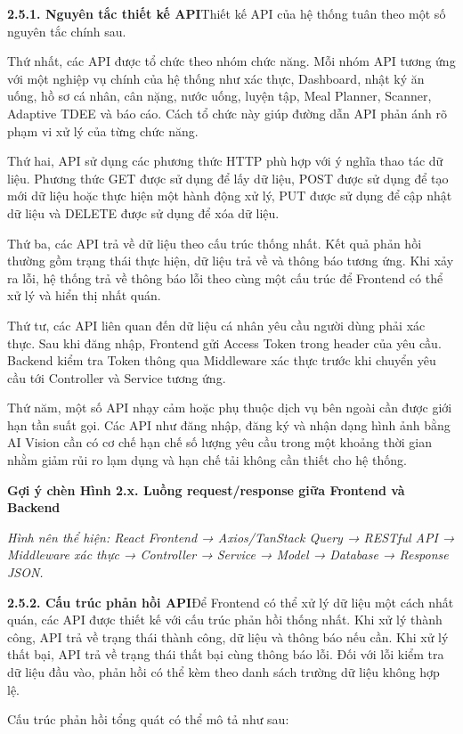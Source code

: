 \textbf{2.5.1. Nguyên tắc thiết kế API}Thiết kế API của hệ thống tuân theo một số nguyên tắc chính sau.

Thứ nhất, các API được tổ chức theo nhóm chức năng. Mỗi nhóm API tương ứng với một nghiệp vụ chính của hệ thống như xác thực, Dashboard, nhật ký ăn uống, hồ sơ cá nhân, cân nặng, nước uống, luyện tập, Meal Planner, Scanner, Adaptive TDEE và báo cáo. Cách tổ chức này giúp đường dẫn API phản ánh rõ phạm vi xử lý của từng chức năng.

Thứ hai, API sử dụng các phương thức HTTP phù hợp với ý nghĩa thao tác dữ liệu. Phương thức GET được sử dụng để lấy dữ liệu, POST được sử dụng để tạo mới dữ liệu hoặc thực hiện một hành động xử lý, PUT được sử dụng để cập nhật dữ liệu và DELETE được sử dụng để xóa dữ liệu.

Thứ ba, các API trả về dữ liệu theo cấu trúc thống nhất. Kết quả phản hồi thường gồm trạng thái thực hiện, dữ liệu trả về và thông báo tương ứng. Khi xảy ra lỗi, hệ thống trả về thông báo lỗi theo cùng một cấu trúc để Frontend có thể xử lý và hiển thị nhất quán.

Thứ tư, các API liên quan đến dữ liệu cá nhân yêu cầu người dùng phải xác thực. Sau khi đăng nhập, Frontend gửi Access Token trong header của yêu cầu. Backend kiểm tra Token thông qua Middleware xác thực trước khi chuyển yêu cầu tới Controller và Service tương ứng.

Thứ năm, một số API nhạy cảm hoặc phụ thuộc dịch vụ bên ngoài cần được giới hạn tần suất gọi. Các API như đăng nhập, đăng ký và nhận dạng hình ảnh bằng AI Vision cần có cơ chế hạn chế số lượng yêu cầu trong một khoảng thời gian nhằm giảm rủi ro lạm dụng và hạn chế tải không cần thiết cho hệ thống.

\textbf{Gợi ý chèn Hình 2.x. Luồng request/response giữa Frontend và Backend}

\textit{Hình nên thể hiện: React Frontend → Axios/TanStack Query → RESTful API → Middleware xác thực → Controller → Service → Model → Database → Response JSON.}

\textbf{2.5.2. Cấu trúc phản hồi API}Để Frontend có thể xử lý dữ liệu một cách nhất quán, các API được thiết kế với cấu trúc phản hồi thống nhất. Khi xử lý thành công, API trả về trạng thái thành công, dữ liệu và thông báo nếu cần. Khi xử lý thất bại, API trả về trạng thái thất bại cùng thông báo lỗi. Đối với lỗi kiểm tra dữ liệu đầu vào, phản hồi có thể kèm theo danh sách trường dữ liệu không hợp lệ.

Cấu trúc phản hồi tổng quát có thể mô tả như sau:


